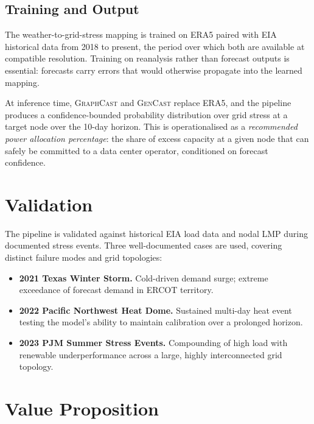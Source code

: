 \documentclass[10pt,letterpaper]{article}
\newcommand{\graphcast}{\textsc{GraphCast}\xspace}
\newcommand{\gencast}{\textsc{GenCast}\xspace}
\begin{document}
\subsection{Training and Output}

The weather-to-grid-stress mapping is trained on ERA5 paired with EIA historical data from
2018 to present, the period over which both are available at compatible resolution. Training on
reanalysis rather than forecast outputs is essential: forecasts carry errors that would otherwise
propagate into the learned mapping.

At inference time, \graphcast and \gencast replace ERA5, and the pipeline produces a
confidence-bounded probability distribution over grid stress at a target node over the 10-day
horizon. This is operationalised as a \emph{recommended power allocation percentage}: the
share of excess capacity at a given node that can safely be committed to a data center
operator, conditioned on forecast confidence.

\section{Validation}

The pipeline is validated against historical EIA load data and nodal LMP during documented
stress events. Three well-documented cases are used, covering distinct failure modes and
grid topologies:

\begin{itemize}
  \item \textbf{2021 Texas Winter Storm.} Cold-driven demand surge; extreme exceedance of
        forecast demand in ERCOT territory.
  \item \textbf{2022 Pacific Northwest Heat Dome.} Sustained multi-day heat event testing
        the model's ability to maintain calibration over a prolonged horizon.
  \item \textbf{2023 PJM Summer Stress Events.} Compounding of high load with renewable
        underperformance across a large, highly interconnected grid topology.
\end{itemize}

\section{Value Proposition}
\end{document}
